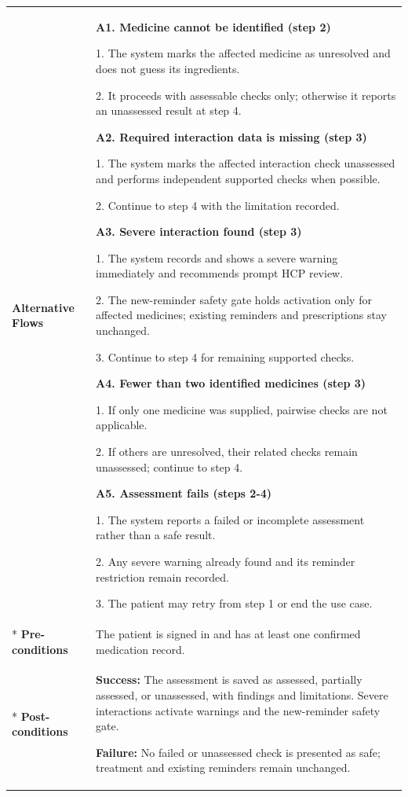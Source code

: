 \begin{longtable}{|p{}|p{}|}
\hline
\textbf{Alternative Flows} &
\textbf{A1. Medicine cannot be identified (step 2)}\par
1. The system marks the affected medicine as unresolved and does not guess its ingredients.\par
2. It proceeds with assessable checks only; otherwise it reports an unassessed result at step 4.
\par
\textbf{A2. Required interaction data is missing (step 3)}\par
1. The system marks the affected interaction check unassessed and performs independent supported checks when possible.\par
2. Continue to step 4 with the limitation recorded.
\par
\textbf{A3. Severe interaction found (step 3)}\par
1. The system records and shows a severe warning immediately and recommends prompt HCP review.\par
2. The new-reminder safety gate holds activation only for affected medicines; existing reminders and prescriptions stay unchanged.\par
3. Continue to step 4 for remaining supported checks.
\par
\textbf{A4. Fewer than two identified medicines (step 3)}\par
1. If only one medicine was supplied, pairwise checks are not applicable.\par
2. If others are unresolved, their related checks remain unassessed; continue to step 4.
\par
\textbf{A5. Assessment fails (steps 2-4)}\par
1. The system reports a failed or incomplete assessment rather than a safe result.\par
2. Any severe warning already found and its reminder restriction remain recorded.\par
3. The patient may retry from step 1 or end the use case.
\\* \hline
\textbf{Pre-conditions} & The patient is signed in and has at least one confirmed medication record. \\* \hline
\textbf{Post-conditions} & \textbf{Success:} The assessment is saved as assessed, partially assessed, or unassessed, with findings and limitations. Severe interactions activate warnings and the new-reminder safety gate.\par
\textbf{Failure:} No failed or unassessed check is presented as safe; treatment and existing reminders remain unchanged. \\ \hline
\end{longtable}

